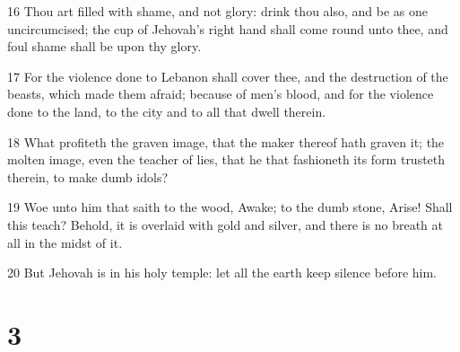 \par 16 Thou art filled with shame, and not glory: drink thou also, and be as one uncircumcised; the cup of Jehovah's right hand shall come round unto thee, and foul shame shall be upon thy glory.
\par 17 For the violence done to Lebanon shall cover thee, and the destruction of the beasts, which made them afraid; because of men's blood, and for the violence done to the land, to the city and to all that dwell therein.
\par 18 What profiteth the graven image, that the maker thereof hath graven it; the molten image, even the teacher of lies, that he that fashioneth its form trusteth therein, to make dumb idols?
\par 19 Woe unto him that saith to the wood, Awake; to the dumb stone, Arise! Shall this teach? Behold, it is overlaid with gold and silver, and there is no breath at all in the midst of it.
\par 20 But Jehovah is in his holy temple: let all the earth keep silence before him.

\chapter{3}

